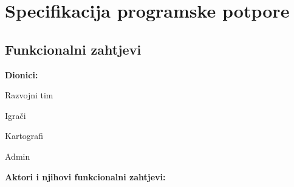 \chapter{Specifikacija programske potpore}
		
	\section{Funkcionalni zahtjevi}
			
			
			\noindent \textbf{Dionici:}
			
			\begin{packed_enum}
				
				\item Razvojni tim
				\item Igrači				
				\item Kartografi
				\item Admin
				
			\end{packed_enum}
			
			\noindent \textbf{Aktori i njihovi funkcionalni zahtjevi:}
			
